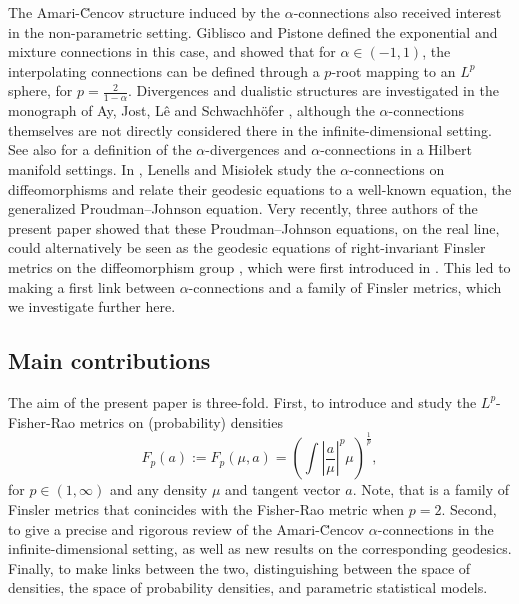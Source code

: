 \documentclass[11pt]{amsart}
\theoremstyle{definition}
\newcommand{\Abs}[1]{\left|#1\right|}
\begin{document}
The Amari-\u{C}encov structure induced by the $\alpha$-connections also received interest in the non-parametric setting. Giblisco and Pistone \cite{gibilisco1998connections} defined the exponential and mixture connections in this case, and showed that for $\alpha\in (-1,1)$, the interpolating connections can be defined through a $p$-root mapping to an $L^p$ sphere, for $p=\frac2{1-\alpha}$. 
Divergences and dualistic structures are investigated in the monograph of Ay, Jost, Lê and Schwachhöfer \cite{ay2017information}, although the $\alpha$-connections themselves are not directly considered there in the infinite-dimensional setting. 
See also \cite{newton2012infinite} for a definition of the $\alpha$-divergences and $\alpha$-connections in a Hilbert manifold settings.
In \cite{lenells2014amari}, Lenells and Misio\l{}ek study the $\alpha$-connections on diffeomorphisms and relate their geodesic equations to a well-known equation, the generalized Proudman--Johnson equation. 
Very recently, three authors of the present paper showed that these Proudman--Johnson equations, on the real line, could alternatively be seen as the geodesic equations of right-invariant Finsler metrics on the diffeomorphism group \cite{bauer2022geometric}, which were first introduced in \cite{cotter2020r}. 
This led to making a first link between $\alpha$-connections and a family of Finsler metrics, which we investigate further here.

\subsection{Main contributions}
The aim of the present paper is three-fold. First, to introduce and study the $L^p$-Fisher-Rao metrics on (probability) densities
$$F_p(a):=F_p({\mu},a)=\left(\int\Abs{\frac{a}{\mu}}^p\mu\right)^{\frac{1}{p}},$$
for $p\in(1,\infty)$ and any density $\mu$ and tangent vector $a$. Note, that is a family of Finsler metrics that conincides with the Fisher-Rao metric when $p=2$. Second, to give a precise and rigorous review of the Amari-\u{C}encov $\alpha$-connections in the infinite-dimensional setting, as well as new results on the corresponding geodesics. Finally, to make links between the two, distinguishing between the space of densities, the space of probability densities, and parametric statistical models.
\end{document}
